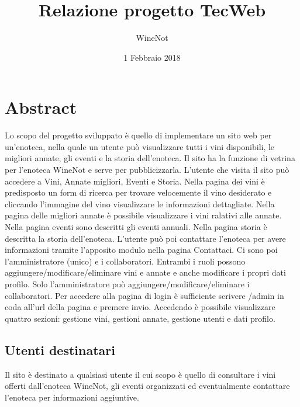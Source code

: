 



\title{\textbf{Relazione progetto TecWeb}}
\author{WineNot}

\date{1 Febbraio 2018}




\makeFrontPage

\tableofcontents

\newpage

\section{Abstract}

Lo scopo del progetto sviluppato è quello di implementare un sito web per un'enoteca,
nella quale un utente può visualizzare tutti i vini disponibili, le migliori annate, 
gli eventi e la storia dell'enoteca. 
Il sito ha la funzione di vetrina per l'enoteca WineNot e serve per pubblicizzarla. 
L'utente che visita il sito può accedere a Vini, Annate migliori, Eventi e Storia. 
Nella pagina dei vini è predisposto un form di ricerca per trovare velocemente il 
vino desiderato e cliccando l'immagine del vino visualizzare le informazioni dettagliate.
Nella pagina delle migliori annate è possibile visualizzare i vini ralativi alle annate.
Nella pagina eventi sono descritti gli eventi annuali.
Nella pagina storia è descritta la storia dell'enoteca.
L'utente può poi contattare l'enoteca per avere informazioni tramite l'apposito modulo nella pagina Contattaci.
Ci sono poi l'amministratore (unico) e i collaboratori. Entrambi i ruoli possono aggiungere/modificare/eliminare 
vini e annate e anche modificare i propri dati profilo. Solo l'amministratore può 
aggiungere/modificare/eliminare i collaboratori.
Per accedere alla pagina di login è sufficiente scrivere /admin in coda all'url della pagina e premere invio.
Accedendo è possibile visualizzare quattro sezioni: gestione vini, gestioni annate, gestione utenti e dati profilo.


\subsection{Utenti destinatari}

Il sito è destinato a qualsiasi utente il cui scopo è quello di consultare
i vini offerti dall'enoteca WineNot, gli eventi organizzati ed eventualmente contattare 
l'enoteca per informazioni aggiuntive. 

